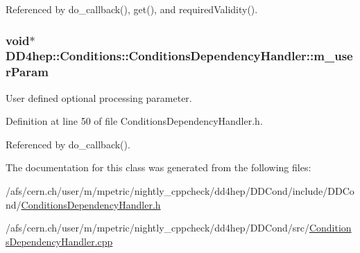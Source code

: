 Referenced by do\_\-callback(), get(), and requiredValidity().\hypertarget{class_d_d4hep_1_1_conditions_1_1_conditions_dependency_handler_a0566a51b0e547abb517f162cf90a6db0}{
\subsubsection[{m\_\-userParam}]{\setlength{\rightskip}{0pt plus 5cm}void$\ast$ {\bf DD4hep::Conditions::ConditionsDependencyHandler::m\_\-userParam}}}
\label{class_d_d4hep_1_1_conditions_1_1_conditions_dependency_handler_a0566a51b0e547abb517f162cf90a6db0}


User defined optional processing parameter. 

Definition at line 50 of file ConditionsDependencyHandler.h.

Referenced by do\_\-callback().

The documentation for this class was generated from the following files:\begin{DoxyCompactItemize}
\item 
/afs/cern.ch/user/m/mpetric/nightly\_\-cppcheck/dd4hep/DDCond/include/DDCond/\hyperlink{_conditions_dependency_handler_8h}{ConditionsDependencyHandler.h}\item 
/afs/cern.ch/user/m/mpetric/nightly\_\-cppcheck/dd4hep/DDCond/src/\hyperlink{_conditions_dependency_handler_8cpp}{ConditionsDependencyHandler.cpp}\end{DoxyCompactItemize}
